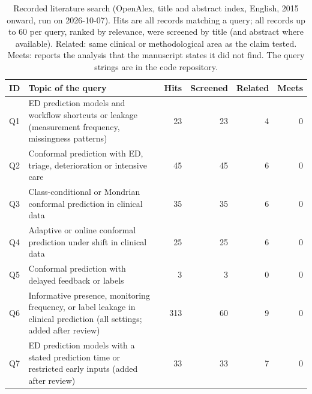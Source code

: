 \begin{table}[t]
\centering
\caption{Recorded literature search (OpenAlex, title and abstract index, English, 2015 onward, run on 2026-10-07). Hits are all records matching a query; all records up to 60 per query, ranked by relevance, were screened by title (and abstract where available). Related: same clinical or methodological area as the claim tested. Meets: reports the analysis that the manuscript states it did not find. The query strings are in the code repository.}
\label{tab:search}
\begin{tabular}{lp{7cm}rrrr}
\toprule
ID & Topic of the query & Hits & Screened & Related & Meets \\
\midrule
Q1 & ED prediction models and workflow shortcuts or leakage (measurement frequency, missingness patterns) & 23 & 23 & 4 & 0 \\
Q2 & Conformal prediction with ED, triage, deterioration or intensive care & 45 & 45 & 6 & 0 \\
Q3 & Class-conditional or Mondrian conformal prediction in clinical data & 35 & 35 & 6 & 0 \\
Q4 & Adaptive or online conformal prediction under shift in clinical data & 25 & 25 & 6 & 0 \\
Q5 & Conformal prediction with delayed feedback or labels & 3 & 3 & 0 & 0 \\
Q6 & Informative presence, monitoring frequency, or label leakage in clinical prediction (all settings; added after review) & 313 & 60 & 9 & 0 \\
Q7 & ED prediction models with a stated prediction time or restricted early inputs (added after review) & 33 & 33 & 7 & 0 \\
\bottomrule
\end{tabular}
\end{table}
